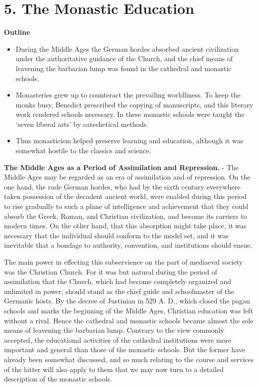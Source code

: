 \documentclass[]{book}
\providecommand{\tightlist}{%
  \setlength{\itemsep}{0pt}\setlength{\parskip}{0pt}}
\begin{document}
\hypertarget{the-monastic-education}{%
\chapter{5. The Monastic Education}\label{the-monastic-education}}

\textbf{Outline}

\begin{itemize}
\tightlist
\item
  During the Middle Ages the German hordes absorbed ancient civilization under the authoritative guidance of the Church, and the chief means of leavening the barbarian lump was found in the cathedral and monastic schools.
\item
  Monasteries grew up to counteract the prevailing worldliness. To keep the monks busy, Benedict prescribed the copying of manuscripts, and this literary work rendered schools necessary. In these monastic schools were taught the `seven liberal arts' by catechetical methods.
\item
  Thus monasticism helped preserve learning and education, although it was somewhat hostile to the classics and science.
\end{itemize}

\textbf{The Middle Ages as a Period of Assimilation and Repression.} - The Middle Ages may be regarded as an era of assimilation and of repression. On the one hand, the rude German hordes, who had by the sixth century everywhere taken possession of the decadent ancient world, were enabled during this period to rise gradually to such a plane of intelligence and achievement that they could absorb the Greek, Roman, and Christian civilization, and become its carriers to modern times. On the other hand, that this absorption might take place, it was necessary that the individual should conform to the model set, and it was inevitable that a bondage to authority, convention, and institutions should ensue.

The main power in effecting this subservience on the part of mediaeval society was the Christian Church. For it was but natural during the period of assimilation that the Church, which had become completely organized and unlimited in power, should stand as the chief guide and schoolmaster of the Germanic hosts. By the decree of Justinian in 529 A. D., which closed the pagan schools and marks the beginning of the Middle Ages, Christian education was left without a rival. Hence the cathedral and monastic schools became almost the sole means of leavening the barbarian lump. Contrary to the view commonly accepted, the educational activities of the cathedral institutions were more important and general than those of the monastic schools. But the former have already been somewhat discussed, and so much relating to the course and services of the latter will also apply to them that we may now turn to a detailed description of the monastic schools.
\end{document}

